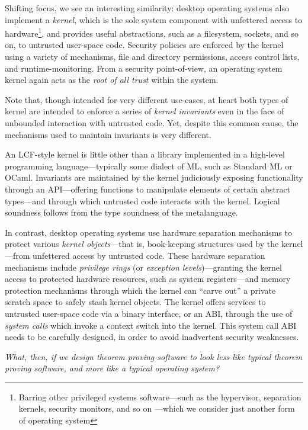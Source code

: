\documentclass[a4paper, 10pt]{article}
\begin{document}
Shifting focus, we see an interesting similarity: desktop operating systems also implement a \emph{kernel}, which is the sole system component with unfettered access to hardware\footnote{Barring other privileged systems software---such as the hypervisor, separation kernels, security monitors, and so on ---which we consider just another form of operating system}, and provides useful abstractions, such as a filesystem, sockets, and so on, to untrusted user-space code.
Security policies are enforced by the kernel using a variety of mechanisms, file and directory permissions, access control lists, and runtime-monitoring.
From a security point-of-view, an operating system kernel again acts as the \emph{root of all trust} within the system.

Note that, though intended for very different use-cases, at heart both types of kernel are intended to enforce a series of \emph{kernel invariants} even in the face of unbounded interaction with untrusted code.
Yet, despite this common cause, the mechanisms used to maintain invariants is very different.

An LCF-style kernel is little other than a library implemented in a high-level programming language---typically some dialect of ML, such as Standard ML or OCaml.
Invariants are maintained by the kernel judiciously exposing functionality through an API---offering functions to manipulate elements of certain abstract types---and through which untrusted code interacts with the kernel.
Logical soundness follows from the type soundness of the metalanguage.

In contrast, desktop operating systems use hardware separation mechanisms to protect various \emph{kernel objects}---that is, book-keeping structures used by the kernel---from unfettered access by untrusted code.
These hardware separation mechanisms include \emph{privilege rings} (or \emph{exception levels})---granting the kernel access to protected hardware resources, such as system registers---and memory protection mechanisms through which the kernel can ``carve out'' a private scratch space to safely stash kernel objects.
The kernel offers services to untrusted user-space code via a binary interface, or an ABI, through the use of \emph{system calls} which invoke a context switch into the kernel.
This system call ABI needs to be carefully designed, in order to avoid inadvertent security weaknesses.

\emph{What, then, if we design theorem proving software to look less like typical theorem proving software, and more like a typical operating system?}
\end{document}
